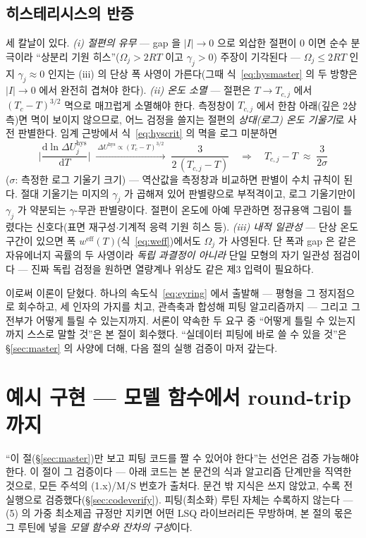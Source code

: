 \documentclass[11pt,a4paper]{article}
\newcommand{\dd}{\mathrm{d}}
\newcommand{\eff}{\mathrm{eff}}
\newcommand{\hys}{\mathrm{hys}}
\begin{document}
\subsection{히스테리시스의 반증}
세 칼날이 있다. \emph{(i) 절편의 유무} — gap 을 $|I|\to0$ 으로 외삽한 절편이 $0$ 이면 순수 분극이라 ``상분리 기원
히스''($\Omega_j>2RT$ 이고 $\gamma_j>0$) 주장이 기각된다 — $\Omega_j\le2RT$ 인지
$\gamma_j\approx0$ 인지는 (iii) 의 단상 폭 사영이 가른다(그때 식~\eqref{eq:hysmaster} 의 두 방향은
$|I|\to0$ 에서 완전히 겹쳐야 한다).
\emph{(ii) 온도 소멸} — 절편은 $T\to T_{c,j}$ 에서 $(T_c-T)^{3/2}$ 멱으로 매끄럽게 소멸해야 한다.
측정창이 $T_{c,j}$ 에서 한참 아래(깊은 2상측)면 멱이 보이지 않으므로, 어느 검정을 쓸지는 절편의
\emph{상대(로그) 온도 기울기}로 사전 판별한다. 임계 근방에서 식~\eqref{eq:hyscrit} 의 멱을 로그
미분하면
\begin{equation}
\bigg|\frac{\dd\ln\Delta U_j^\hys}{\dd T}\bigg|
\;\xrightarrow{\ \Delta U^\hys\propto(T_{c}-T)^{3/2}\ }\;
\frac{3}{2\,(T_{c,j}-T)}
\quad\Longrightarrow\quad
T_{c,j}-T\;\approx\;\frac{3}{2\sigma}
\label{eq:logslopeT}
\end{equation}
($\sigma$: 측정한 로그 기울기 크기) — 역산값을 측정창과 비교하면 판별이 수치 규칙이 된다. 절대 기울기는 미지의 $\gamma_j$ 가 곱해져 있어 판별량으로 부적격이고, 로그 기울기만이
$\gamma_j$ 가 약분되는 $\gamma$-무관 판별량이다. 절편이 온도에 아예 무관하면 정규용액 그림이 틀렸다는
신호다(표면 재구성$\cdot$기계적 응력 기원 히스 등). \emph{(iii) 내적 일관성} — 단상 온도 구간이 있으면
폭 $w^{\eff}(T)$(식~\eqref{eq:weff})에서도 $\Omega_j$ 가 사영된다. 단 폭과 gap 은 같은 자유에너지
곡률의 두 사영이라 \emph{독립 과결정이 아니라} 단일 모형의 자기 일관성 점검이다 — 진짜 독립 검정을
원하면 열량계나 위상도 같은 제3 입력이 필요하다.

\medskip
이로써 이론이 닫혔다. 하나의 속도식~\eqref{eq:eyring} 에서 출발해 — 평형을 그 정지점으로 회수하고, 세
인자의 가지를 치고, 관측축과 합성해 피팅 알고리즘까지 — 그리고 그 전부가 어떻게 틀릴 수 있는지까지.
서론이 약속한 두 요구 중 ``어떻게 틀릴 수 있는지까지 스스로 말할 것''은 본 절이 회수했다. ``실데이터 피팅에 바로 쓸 수
있을 것''은 \S\ref{sec:master} 의 사양에 더해, 다음 절의 실행 검증이 마저 갚는다.

\section{예시 구현 — 모델 함수에서 round-trip 까지}\label{sec:code}
``이 절(\S\ref{sec:master})만 보고 피팅 코드를 짤 수 있어야 한다''는 선언은 검증 가능해야 한다. 이
절이 그 검증이다 — 아래 코드는 본 문건의 식과 알고리즘 단계만을 직역한 것으로, 모든 주석의 (1.x)/M/S
번호가 출처다. 문건 밖 지식은 쓰지 않았고, 수록 전 실행으로 검증했다(\S\ref{sec:codeverify}).
피팅(최소화) 루틴 자체는 수록하지 않는다 — (5) 의 가중 최소제곱 규정만 지키면 어떤 LSQ 라이브러리든
무방하며, 본 절의 몫은 그 루틴에 넣을 \emph{모델 함수와 잔차의 구성}이다.
\end{document}
